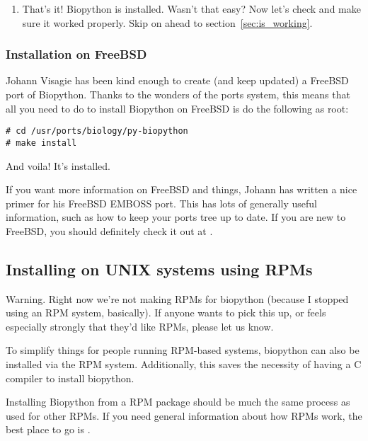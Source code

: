 \documentclass{article}
\begin{document}
\begin{enumerate}
\begin{enumerate}
\end{enumerate}

\item That's it! Biopython is installed. Wasn't that easy? Now let's check and make sure it worked properly. Skip on ahead to section~\ref{sec:is_working}.

\end{enumerate}

\subsubsection{Installation on FreeBSD}

Johann Visagie has been kind enough to create (and keep updated) a FreeBSD port of Biopython. Thanks to the wonders of the ports system, this means that all you need to do to install Biopython on FreeBSD is do the following as root:

\begin{verbatim}
# cd /usr/ports/biology/py-biopython
# make install
\end{verbatim}

And voila! It's installed. 


If you want more information on FreeBSD and things, Johann has written a nice primer for his FreeBSD EMBOSS port. This has lots of generally useful information, such as how to keep your ports tree up to date. If you are new to FreeBSD, you should definitely check it out at .

\subsection{Installing on UNIX systems using RPMs}

Warning. Right now we're not making RPMs for biopython (because I
stopped using an RPM system, basically). If anyone wants to pick this
up, or feels especially strongly that they'd like RPMs, please let us
know.

To simplify things for people running RPM-based systems, biopython can
also be installed via the RPM system. Additionally, this saves the 
necessity of having a C compiler to install biopython. 


Installing Biopython from a RPM package should be much the same process as used for other RPMs. If you need general information about how RPMs work, the best place to go is .
\end{document}
